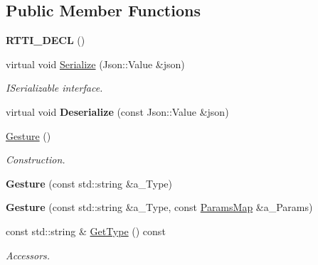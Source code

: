 \subsection*{Public Member Functions}
\begin{DoxyCompactItemize}
\item 
\mbox{\label{class_gesture_ab2d9cebca764207566feffc774dfaa06}} 
{\bfseries R\+T\+T\+I\+\_\+\+D\+E\+CL} ()
\item 
\mbox{\label{class_gesture_a7a3df706550bedd9fdd7df76618fd2e6}} 
virtual void \hyperlink{class_gesture_a7a3df706550bedd9fdd7df76618fd2e6}{Serialize} (Json\+::\+Value \&json)
\begin{DoxyCompactList}\small\item\em I\+Serializable interface. \end{DoxyCompactList}\item 
\mbox{\label{class_gesture_ae2ffef97bf23de5909bb482d8dc52155}} 
virtual void {\bfseries Deserialize} (const Json\+::\+Value \&json)
\item 
\mbox{\label{class_gesture_a840ff60bea4128f137c5b114abc844f6}} 
\hyperlink{class_gesture_a840ff60bea4128f137c5b114abc844f6}{Gesture} ()
\begin{DoxyCompactList}\small\item\em Construction. \end{DoxyCompactList}\item 
\mbox{\label{class_gesture_ac3c273ee5e5ac8c1a170c97538929aec}} 
{\bfseries Gesture} (const std\+::string \&a\+\_\+\+Type)
\item 
\mbox{\label{class_gesture_af0fb78e7c333a92dacef56975eb96e9f}} 
{\bfseries Gesture} (const std\+::string \&a\+\_\+\+Type, const \hyperlink{class_params_map}{Params\+Map} \&a\+\_\+\+Params)
\item 
\mbox{\label{class_gesture_accb71d86b7be76eb9db494a97122454a}} 
const std\+::string \& \hyperlink{class_gesture_accb71d86b7be76eb9db494a97122454a}{Get\+Type} () const
\begin{DoxyCompactList}\small\item\em Accessors. \end{DoxyCompactList}\item 

\end{DoxyCompactItemize}
